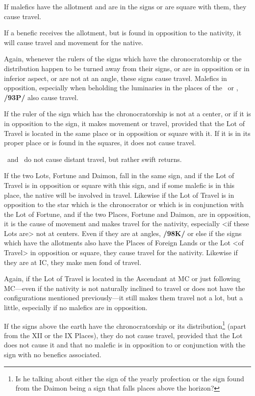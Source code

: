 If malefics have the allotment and are in the signs or are square with them, they cause travel. 

If a benefic receives the allotment, but is found in opposition to the nativity, it will cause travel and movement for the native. 

Again, whenever the rulers of the signs which have the chronocratorship or the distribution happen to be turned
away from their signs, or are in opposition or in inferior aspect, or are not at an angle, these signs cause
travel. Malefics in opposition, especially when beholding the luminaries in the places of the \Sun\, or \Moon,
\textbf{/93P/} also cause travel. 

If the ruler of the sign which has the chronocratorship is not at a center, or if it is in opposition to the sign, it makes movement or travel, provided that the Lot of Travel is located in the same place or in opposition or square with it. If it is in its proper place or is found in the squares, it does
not cause travel.

 
\Mercury\, and \Venus\, do not cause distant travel, but rather swift returns. 

If the two Lots, Fortune and Daimon, fall in the same sign, and if the Lot of Travel is in opposition or square with this sign, and if some malefic is in this place, the native will be involved in travel. Likewise if the Lot of Travel is in opposition to the star which is the chronocrator or which is in conjunction with the Lot of Fortune, and if the two Places, Fortune and Daimon, are in opposition, it is the cause of movement and makes travel for the nativity, especially <if these Lots are> not at centers. Even if they are at angles, \textbf{/98K/} or else if the signs which have the allotments also have the Places of Foreign Lands or the Lot <of Travel> in opposition or square, they cause travel for the nativity. Likewise if they are at IC, they make men fond of travel. 

Again, if the Lot of Travel is located in the Ascendant at MC or just following MC—even if the nativity is not naturally inclined to travel or does not have the configurations mentioned previously—it still makes them travel not a lot, but a little, especially if no malefics are in opposition.

If the signs above the earth have the chronocratorship or its distribution\footnote{Is he talking about either the sign of the yearly profection or the sign found from the Daimon being a sign that falls places above the horizon?} (apart from the XII or the IX Places), they do not cause travel, provided that the Lot does not cause it and that no malefic is in opposition to or conjunction with the sign with no benefics associated. 

